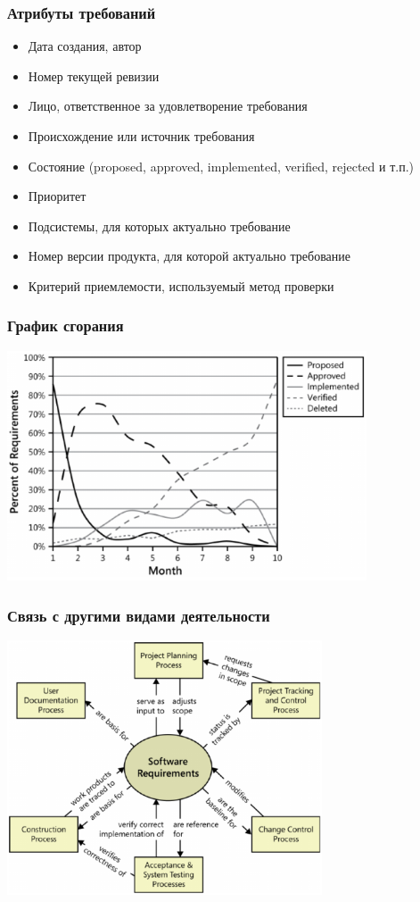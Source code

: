 \documentclass{../../slides-style}
\begin{document}
    \begin{frame}
        \frametitle{Атрибуты требований}
        \begin{itemize}
            \item Дата создания, автор
            \item Номер текущей ревизии
            \item Лицо, ответственное за удовлетворение требования
            \item Происхождение или источник требования
            \item Состояние (proposed, approved, implemented, verified, rejected и т.п.)
            \item Приоритет
            \item Подсистемы, для которых актуально требование
            \item Номер версии продукта, для которой актуально требование
            \item Критерий приемлемости, используемый метод проверки
        \end{itemize}
    \end{frame}

    \begin{frame}
        \frametitle{График сгорания}
        \begin{center}
            \includegraphics[width=0.8\textwidth]{burndown.png}
        \end{center}
    \end{frame}

    \begin{frame}
        \frametitle{Связь с другими видами деятельности}
        \begin{center}
            \includegraphics[width=0.7\textwidth]{requirementsAndOtherActivities.png}
        \end{center}
    \end{frame}
\end{document}
